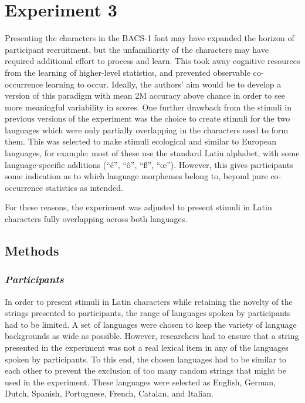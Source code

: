 \section{Experiment 3}
\label{Exp3}
\setlength{\parindent}{20pt}
\justifying

\noindent
Presenting the characters in the BACS-1 font may have expanded the horizon of participant recruitment, but the unfamiliarity of the characters may have required additional effort to process and learn. This took away cognitive resources from the learning of higher-level statistics, and prevented observable co-occurrence learning to occur. Ideally, the authors' aim would be to develop a version of this paradigm with mean 2M accuracy above chance in order to see more meaningful variability in scores. One further drawback from the stimuli in previous versions of the experiment was the choice to create stimuli for the two languages which were only partially overlapping in the characters used to form them. This was selected to make stimuli ecological and similar to European languages, for example: most of these use the standard Latin alphabet, with some language-specific additions (``é'', ``ô'', ``\ss'', ``œ''). However, this gives participants some indication as to which language morphemes belong to, beyond pure co-occurrence statistics as intended. 

For these reasons, the experiment was adjusted to present stimuli in Latin characters fully overlapping across both languages.

\subsection{Methods}
\label{Methods3}

\subsubsection{\large{\emph{Participants}}}
\label{Participants3}

\noindent
In order to present stimuli in Latin characters while retaining the novelty of the strings presented to participants, the range of languages spoken by participants had to be limited. A set of languages were chosen to keep the variety of language backgrounds as wide as possible. However, researchers had to ensure that a string presented in the experiment was not a real lexical item in any of the languages spoken by participants. To this end, the chosen languages had to be similar to each other to prevent the exclusion of too many random strings that might be used in the experiment. These languages were selected as English, German, Dutch, Spanish, Portuguese, French, Catalan, and Italian.

